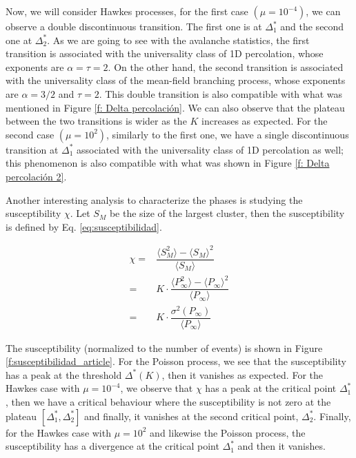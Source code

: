 Now, we will consider Hawkes processes, for the first case $\left( \mu=10^{-4} \right)$, we can observe a double discontinuous transition. The first one is at $\Delta_1^*$ and the second one at 
$\Delta_2^*$. As we are going to see with the avalanche statistics, the first transition is associated with the universality class of 1D percolation, whose exponents are $\alpha=\tau=2$. 
On the other hand, the second transition is associated with the universality class of the mean-field branching process, whose exponents are $\alpha=3/2$ and $\tau=2$. This double transition 
is also compatible with what was mentioned in Figure \ref{f: Delta percolación}. We can also observe that the plateau between the two transitions is wider as the $K$ increases as expected.
For the second case $\left( \mu=10^2 \right)$, similarly to the first one, we have a single discontinuous transition at $\Delta_1^*$ associated with the universality class of 1D percolation
as well; this phenomenon is also compatible with what was shown in Figure \ref{f: Delta percolación 2}.

Another interesting analysis to characterize the phases is studying the susceptibility $\chi$. Let $S_M$ be the size of the largest cluster, then the susceptibility is defined by 
Eq. \ref{eq:susceptibilidad}. 

\begin{equation}
    \begin{split}
        \chi =& \dfrac{ \langle S_M^2 \rangle - \langle S_M \rangle^2 }{\langle S_M \rangle}\\
             =& K\cdot \dfrac{\langle P_{\infty}^2 \rangle - \langle P_{\infty} \rangle^2}{\langle P_{\infty} \rangle}\\
             =& K\cdot \dfrac{\sigma^2\left( P_\infty \right)}{\langle P_{\infty} \rangle}
    \end{split}
    \label{eq:susceptibilidad}
\end{equation}

The susceptibility (normalized to the number of events) is shown in Figure \ref{f:susceptibilidad_article}. For the Poisson process, we see that the susceptibility has a peak at the
threshold $\Delta^*(K)$, then it vanishes as expected. For the Hawkes case with $\mu=10^{-4}$, we observe that $\chi$ has a peak at the critical point $\Delta_1^*$, then 
we have a critical behaviour where the susceptibility is not zero at the plateau $[\Delta_1^*,\Delta_2^*]$ and finally, it vanishes at the second critical point, $\Delta_2^*$. Finally, 
for the Hawkes case with $\mu=10^2$ and likewise the Poisson process, the susceptibility has a divergence at the critical point $\Delta_1^*$ and then it vanishes. 

